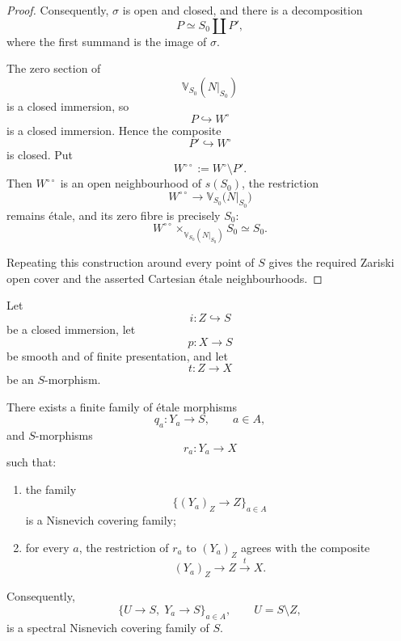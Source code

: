 \begin{proof}
Consequently, \(\sigma\) is open and closed, and there is a
decomposition
\[
    P
    \simeq
    S_0
    \coprod
    P',
\]
where the first summand is the image of \(\sigma\).

The zero section of
\[
    \mathbb V_{S_0}(N|_{S_0})
\]
is a closed immersion, so
\[
    P
    \hookrightarrow
    W^\circ
\]
is a closed immersion.  Hence the composite
\[
    P'
    \hookrightarrow
    W^\circ
\]
is closed.  Put
\[
    W^{\circ\circ}
    :=
    W^\circ\setminus P'.
\]
Then \(W^{\circ\circ}\) is an open neighbourhood of \(s(S_0)\), the
restriction
\[
    W^{\circ\circ}
    \longrightarrow
    \mathbb V_{S_0}
    \bigl(
        N|_{S_0}
    \bigr)
\]
remains étale, and its zero fibre is precisely \(S_0\):
\[
    W^{\circ\circ}
    \times_{
        \mathbb V_{S_0}(N|_{S_0})
    }
    S_0
    \simeq
    S_0.
\]

Repeating this construction around every point of \(S\) gives the
required Zariski open cover and the asserted Cartesian étale
neighbourhoods.
\end{proof}


\begin{lemma}
\label{lem:nisnevich-extension-partial-section}
Let
\[
    i
    \colon
    Z
    \hookrightarrow
    S
\]
be a closed immersion, let
\[
    p
    \colon
    X
    \longrightarrow
    S
\]
be smooth and of finite presentation, and let
\[
    t
    \colon
    Z
    \longrightarrow
    X
\]
be an \(S\)-morphism.

There exists a finite family of étale morphisms
\[
    q_a
    \colon
    Y_a
    \longrightarrow
    S,
    \qquad
    a\in A,
\]
and \(S\)-morphisms
\[
    r_a
    \colon
    Y_a
    \longrightarrow
    X
\]
such that:
\begin{enumerate}[label=(\roman*)]
    \item the family
    \[
        \{(Y_a)_Z\to Z\}_{a\in A}
    \]
    is a Nisnevich covering family;

    \item for every \(a\), the restriction of \(r_a\) to
    \((Y_a)_Z\) agrees with the composite
    \[
        (Y_a)_Z
        \longrightarrow
        Z
        \xrightarrow{t}
        X.
    \]
\end{enumerate}
Consequently,
\[
    \{U\to S,\;Y_a\to S\}_{a\in A},
    \qquad
    U=S\setminus Z,
\]
is a spectral Nisnevich covering family of \(S\).
\end{lemma}

